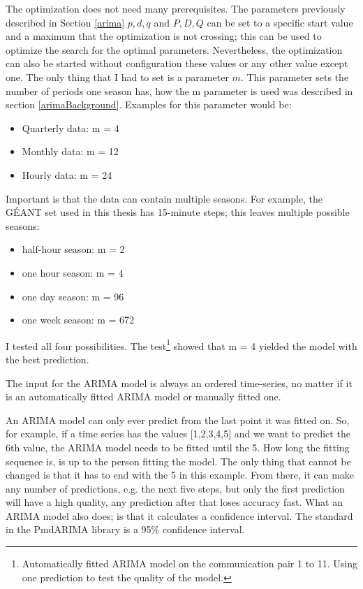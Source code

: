 The optimization does not need many prerequisites.
The parameters previously described in Section \ref{arima} $p,d,q$ and $P,D,Q$ can be set to a specific start value and a maximum that the optimization is not crossing; this can be used to optimize the search for the optimal parameters.
Nevertheless, the optimization can also be started without configuration these values or any other value except one.
The only thing that I had to set is a parameter $m$.
This parameter sets the number of periods one season has, how the m parameter is used was described in section \ref{arimaBackground}.
Examples for this parameter would be:
\begin{itemize}
	\item Quarterly data: m = 4
	\item Monthly data: m = 12
	\item Hourly data: m = 24
\end{itemize}
Important is that the data can contain multiple seasons.
For example, the GÉANT set used in this thesis has 15-minute steps; this leaves multiple possible seasons:
\begin{itemize}
	\item half-hour season: m = 2
	\item one hour season: m = 4
	\item one day season: m = 96
	\item one week season: m = 672
\end{itemize}
I tested all four possibilities.
The test\footnote{Automatically fitted ARIMA model on the communication pair 1 to 11. Using one prediction to test the quality of the model.} showed that m = 4 yielded the model with the best prediction.

The input for the ARIMA model is always an ordered time-series, no matter if it is an automatically fitted ARIMA model or manually fitted one.

An ARIMA model can only ever predict from the last point it was fitted on.
So, for example, if a time series has the values [1,2,3,4,5] and we want to predict the 6th value, the ARIMA model needs to be fitted until the 5.
How long the fitting sequence is, is up to the person fitting the model.
The only thing that cannot be changed is that it has to end with the 5 in this example.
From there, it can make any number of predictions, e.g. the next five steps, but only the first prediction will have a high quality, any prediction after that loses accuracy fast.
What an ARIMA model also does; is that it calculates a confidence interval.
The standard in the PmdARIMA library is a 95\% confidence interval.